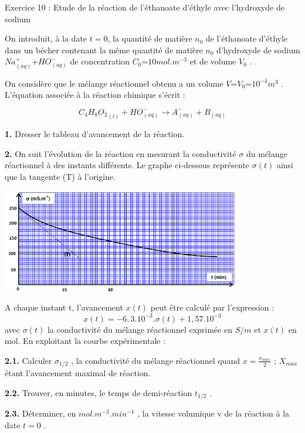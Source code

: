 \documentclass[12pt, french]{article}
\begin{document}
\begin{Box2}{Exercice 10 : Etude de la réaction de l’éthanoate d’éthyle avec l’hydroxyde de sodium}

	On introduit, à la date $t = 0$, la quantité de matière $n_0$ de l’éthanoate d’éthyle dans un bécher
	contenant la même quantité de matière $n_0$ d’hydroxyde de sodium $Na^+_{(aq)}$+$HO^-_{(aq)}$ de concentration
	$C_0 $=$10 mol.m^{-3}$ et de volume $V_0$ .

	On considère que le mélange réactionnel obtenu a un volume $V $=$V_0$=$10^{-4} m^3$ .
L’équation associée à la réaction chimique s’écrit :

$${C_4H_8O_2}_{(l)} + HO^-_{(aq)} \rightarrow A^-_{(aq)} + B_{(aq)}$$

\textbf{1. }Dresser le tableau d’avancement de la réaction.

\textbf{2. }On suit l’évolution de la réaction en mesurant la conductivité $\sigma$ du mélange réactionnel à des
instants différents.
Le graphe ci-dessous représente $\sigma{(t)}$ ainsi que la tangente (T) à l’origine.

  \begin{center}
	\includegraphics[width=0.8\textwidth]{./img/ex10.png}
  \end{center}

A chaque instant t, l’avancement $x(t)$ peut être calculé par l’expression :
$$x(t) = -6,3.10^{-3}.\sigma(t) + 1,57.10^{-3}$$
avec $\sigma{(t)}$ la conductivité du mélange réactionnel exprimée en
$S/m$ et $x(t)$ en mol. En exploitant la courbe expérimentale :

\textbf{2.1. }Calculer $\sigma_{1/2}$ , la conductivité du mélange réactionnel quand $x = \frac{x_{max}}{2}$ ; $X_{max}$ étant
l’avancement maximal de réaction.

\textbf{2.2. }Trouver, en minutes, le temps de demi-réaction $t_{1/2}$ .

\textbf{2.3. }Déterminer, en $mol.m^{-3}.min^{-1}$ , la vitesse volumique v de la réaction à la date $t=0$ .

\end{Box2}
\end{document}
